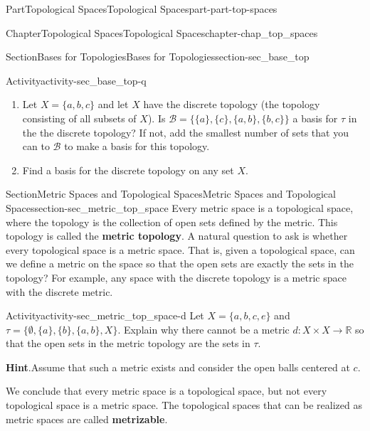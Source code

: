 \documentclass[oneside,10pt,]{book}
\newcommand{\blocktitlefont}{\relax}
\newcommand{\terminology}[1]{\textbf{#1}}
\numberwithin{equation}{chapter}
\newcommand{\R}{\mathbb{R}}
\begin{document}
\begin{partptx}{Part}{Topological Spaces}{}{Topological Spaces}{}{}{part-part-top-spaces}
\begin{chapterptx}{Chapter}{Topological Spaces}{}{Topological Spaces}{}{}{chapter-chap_top_spaces}
\begin{sectionptx}{Section}{Bases for Topologies}{}{Bases for Topologies}{}{}{section-sec_base_top}
\begin{activity}{Activity}{}{activity-sec_base_top-q}
\begin{enumerate}[font=\bfseries,label=(\alph*),ref=\alph*]
\begin{enumerate}[font=\bfseries,label=(\roman*),ref=\theenumi.\roman*]
\begin{equation*}
\end{equation*}
a basis for \(\tau\)? If not, add the smallest number of sets that you can to \(\mathcal{B}\) to make a basis for this topology.%
\end{enumerate}%
\item{}Let \(X=\{a,b,c\}\) and let \(X\) have the discrete topology (the topology consisting of all subsets of \(X\)). Is \(\mathcal{B} = \{\{a\},\{c\},\{a,b\},\{b,c\} \}\) a basis for \(\tau\) in the the discrete topology? If not, add the smallest number of sets that you can to \(\mathcal{B}\) to make a basis for this topology.%
\item{}Find a basis for the discrete topology on any set \(X\).%
\end{enumerate}%
\end{activity}%
\end{sectionptx}
%
%
\typeout{************************************************}
\typeout{************************************************}
%
\begin{sectionptx}{Section}{Metric Spaces and Topological Spaces}{}{Metric Spaces and Topological Spaces}{}{}{section-sec_metric_top_space}
%
Every metric space is a topological space, where the topology is the collection of open sets defined by the metric. This topology is called the \terminology{metric topology}. A natural question to ask is whether every topological space is a metric space. That is, given a topological space, can we define a metric on the space so that the open sets are exactly the sets in the topology? For example, any space with the discrete topology is a metric space with the discrete metric.%
\begin{activity}{Activity}{}{activity-sec_metric_top_space-d}%
Let \(X = \{a,b,c,e\}\) and \(\tau = \{\emptyset, \{a\}, \{b\}, \{a,b\}, X \}\). Explain why there cannot be a metric \(d : X \times X \to \R\) so that the open sets in the metric topology are the sets in \(\tau\).%
\par\smallskip%
\noindent\textbf{\blocktitlefont Hint}.\hypertarget{hint-sec_metric_top_space-d-b}{}\quad{}Assume that such a metric exists and consider the open balls centered at \(c\).%
\end{activity}%
 We conclude that every metric space is a topological space, but not every topological space is a metric space. The topological spaces that can be realized as metric spaces are called \terminology{metrizable}.%

\end{sectionptx}
\end{chapterptx}
\end{partptx}
\end{document}
